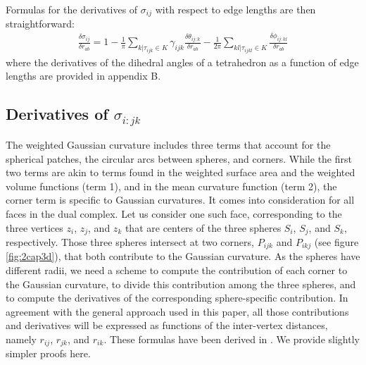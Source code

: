 \documentclass[11 pt]{article}
\theoremstyle{plain} \theorembodyfont{\rmfamily}
\begin{document}
Formulas for the derivatives of $\sigma_{ij}$ with respect to edge lengths are then straightforward:
\begin{eqnarray}
\frac{\delta \sigma_{ij}}{\delta r_{ab}} = 1 - \frac{1}{\pi}\sum_{k | \tau_{ijk} \in K} \gamma_{ijk}  \frac{\delta \theta_{ij:k}}{\delta r_{ab}} - \frac{1}{2\pi}\sum_{kl | \tau_{ijkl} \in K} \frac{\delta \phi_{ij:kl}}{\delta r_{ab}}
\label{eqn:dsigmaij}
\end{eqnarray}
where the derivatives of the dihedral angles of a tetrahedron as a function of edge lengths are provided in appendix B.

   \subsection{Derivatives of $\sigma_{i:jk}$}
   
   The weighted Gaussian curvature includes three terms that account for the spherical patches, the circular arcs between spheres, and corners. While the first two terms are akin to terms found in the weighted surface area and the weighted volume functions (term 1), and in the mean curvature function (term 2), the corner term is specific to Gaussian curvatures. It comes into consideration for all faces in the dual complex. 
  Let us consider one such face,  corresponding to the three vertices $z_i$, $z_j$, and $z_k$ that are centers of the three spheres $S_i$, $S_j$, and $S_k$, respectively.
  Those three spheres intersect at two corners, $P_{ijk}$ and $P_{ikj}$ (see figure \ref{fig:2cap3d}), that both contribute to the Gaussian curvature. As the spheres have different radii, we need a scheme to compute the contribution of each corner to the Gaussian curvature, to divide this contribution among the three spheres, and to compute the derivatives of the corresponding sphere-specific contribution. In agreement with the general approach used in this paper, all those contributions and derivatives will be expressed as functions of the inter-vertex distances, namely $r_{ij}$, $r_{jk}$, and $r_{ik}$. These formulas have been derived in \cite{AkEd19b}. We provide slightly simpler proofs here.  
  
\end{document}
